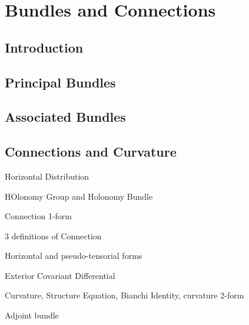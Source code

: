 \chapter{Bundles and Connections}

\section{Introduction}

\section{Principal Bundles}

\section{Associated Bundles}

\section{Connections and Curvature}

Horizontal Distribution

HOlonomy Group and Holonomy Bundle

Connection 1-form


3 definitions of Connection

Horizontal and pseudo-tensorial forms

Exterior Covariant Differential

Curvature, Structure Equation, Bianchi Identity, curvature 2-form

Adjoint bundle

\subsection{}

